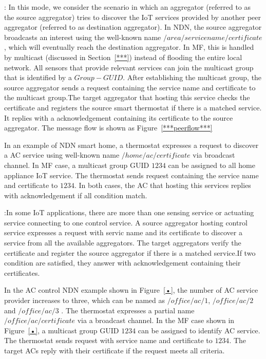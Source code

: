 \vspace{1mm}: In this mode, we consider the scenario in which an aggregator (referred to as the source aggregator) tries to discover the IoT services provided by another peer aggregator (referred to as destination aggregator). In NDN, the source aggregator broadcasts an interest using the well-known name $/area/servicename/certificate$, which will eventually reach the destination aggregator. In MF, this is handled by multicast (discussed in Section~\ref{***}) instead of flooding the entire local network. All sensors that provide relevant services can join the multicast group that is identified by a $Group-GUID$. After establishing the multicast group, the source aggregator sends a request containing the service name and certificate to the multicast group.The target aggregator that hosting this service checks the certificate and registers the source smart thermostat if there is a matched service. It replies with a acknowledgement containing its certificate to the source aggregator.  The message flow is shown as Figure~\ref{***peerflow***}

In an example of NDN smart home, a thermostat expresses a request to discover a AC service using well-known name $/home/ac/certificate$ via broadcast channel. In MF case, a multicast group GUID $1234$ can be assigned to all home appliance IoT service. The thermostat sends request containing the service name and certificate to $1234$. In both cases, the AC that hosting this services replies with acknowledgement if all condition match.

\vspace{1mm}:In some IoT applications, there are more than one sensing service or actuating service connecting to one control service. A source aggregator hosting control service expresses a request with servic name and its certificate to discover a service from all the available aggregators. The target aggregators verify the certificate and register the source   aggregator if there is a matched service.If two condition are satisfied, they answer with acknowledgement containing their certificates.

In the AC control NDN example shown in Figure~\ref{•}, the number of AC service provider increases to three, which can be named as $/office/ac/1$, $/office/ac/2$ and $/office/ac/3$ . The thermostat expresses a partial name $/office/ac/certificate$ via a broadcast channel. In the MF case shown in Figure~\ref{•}, a multicast group GUID $1234$ can be assigned to identify AC service. The thermostat sends request with service name and certificate to $1234$. The target ACs reply with their certificate if the request meets all criteria.

